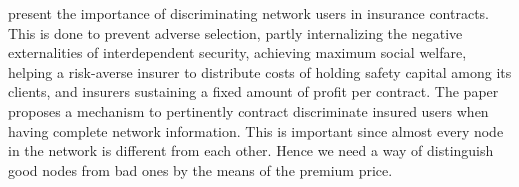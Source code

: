\cite{paldifferentiating} present the importance of discriminating network users in insurance contracts. This is done to prevent adverse selection, partly internalizing the negative externalities of interdependent security, achieving maximum social welfare, helping a risk-averse insurer to distribute costs of holding safety capital among its clients, and insurers sustaining a fixed amount of profit per contract.
The paper proposes a mechanism to pertinently contract discriminate insured users when having complete network information. This is important since almost every node in the network is different from each other. Hence we need a way of distinguish good nodes from bad ones by the means of the premium price.




  